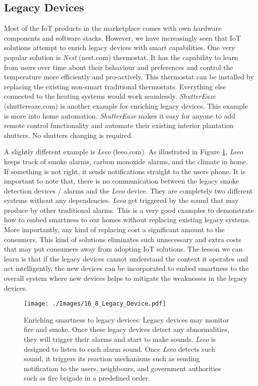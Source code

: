\documentclass[journal]{IEEEtran}
\begin{document}
      \subsection{Legacy Devices}
Most of the IoT products in the marketplace comes with  own hardware components and software stacks. However, we have increasingly seen that  IoT solutions attempt to enrich legacy devices with smart capabilities. One very popular solution is \textit{Nest} (nest.com) thermostat. It has the capability to learn from users over time about their behaviour and preferences and  control the temperature more efficiently and pro-actively. This thermostat can be installed by replacing the existing non-smart traditional thermostats. Everything else connected to the heating systems would work seamlessly.  \textit{ShutterEaze} (shuttereaze.com) is another example for enriching legacy devices. This example is more into home automation. \textit{ShutterEaze} makes it easy for anyone to add remote control functionality and automate their existing interior plantation shutters. No shutters changing is required. 

A slightly different example is \textit{Leeo} (leeo.com). As illustrated in Figure \ref{Figure:Legacy_Device}, \textit{Leeo} keeps track of smoke alarms,  carbon monoxide alarms, and the climate in  home. If something is not right, it sends notifications straight to the users phone. It is important to note that, there is no communication between the legacy smoke detection devices / alarms and the \textit{Leeo} device. They are completely two different systems without any dependencies. \textit{Leeo} get triggered by the sound that may produce by other traditional alarms. This is a very good examples to demonstrate  how to embed smartness to our homes without replacing existing legacy systems. More importantly, any kind of replacing cost a significant amount to the consumers. This kind of solutions eliminates such unnecessary and extra costs that may put consumers away from adopting IoT solutions. The lesson we can learn is that if the legacy devices cannot understand the context it operates and act intelligently, the new devices can be incorporated to embed smartness to the overall system where new devices helps to mitigate the weaknesses in the legacy devices.

      
       \begin{figure}[!h]
        \centering
\texttt{[image: ./Images/16\_8\_Legacy\_Device.pdf]}
\caption{Enriching smartness to legacy devices: Legacy devices may  monitor fire and smoke. Once these legacy devices detect any abnormalities, they will trigger their alarms and start to make sounds. \textit{Leeo} is designed to listen to such alarm sound. Once \textit{Leeo} detects such sound, it triggers its reaction mechanisms such as sending notification to the users, neighbours, and government authorities such as fire brigade in a predefined order. }
        \label{Figure:Legacy_Device}	
\end{figure}      
      
\end{document}
